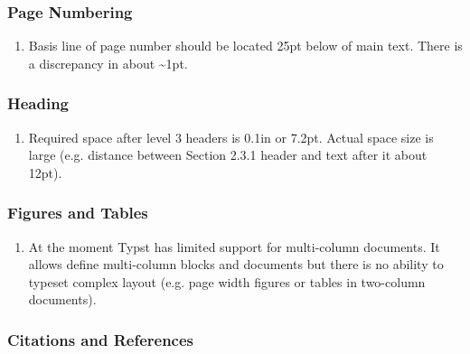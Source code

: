 \subsubsection{Page Numbering}\label{page-numbering}

\begin{enumerate}
\tightlist
\item
  Basis line of page number should be located 25pt below of main text.
  There is a discrepancy in about \textasciitilde1pt.
\end{enumerate}

\subsubsection{Heading}\label{heading}

\begin{enumerate}
\tightlist
\item
  Required space after level 3 headers is 0.1in or 7.2pt. Actual space
  size is large (e.g. distance between Section 2.3.1 header and text
  after it about 12pt).
\end{enumerate}

\subsubsection{Figures and Tables}\label{figures-and-tables}

\begin{enumerate}
\tightlist
\item
  At the moment Typst has limited support for multi-column documents. It
  allows define multi-column blocks and documents but there is no
  ability to typeset complex layout (e.g. page width figures or tables
  in two-column documents).
\end{enumerate}

\subsubsection{Citations and References}\label{citations-and-references}


